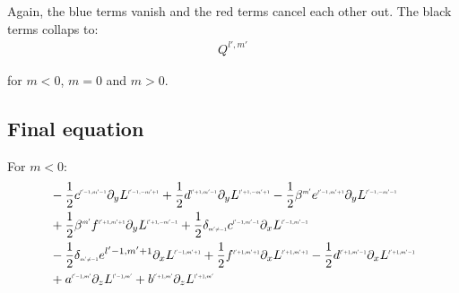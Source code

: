 \documentclass[10pt]{scrartcl}
\begin{document}
Again, the blue terms vanish and the red terms cancel each other out. The black terms collaps to:
\begin{align*}
Q^{l',m'}
\end{align*}

for $m<0$, $m=0$ and $m>0$.

\subsection{Final equation}

For $m<0$:
\begin{align*}
&-\frac{1}{2}c^{\scaleto{l'-1,m'-1}{4pt}}
\partial_y
L^{\scaleto{l'-1,-m'+1}{4pt}}
+\frac{1}{2}d^{\scaleto{l'+1,m'-1}{4pt}}
\partial_y
L^{\scaleto{l'+1,-m'+1}{4pt}}
-\frac{1}{2}\beta^{\scaleto{m'}{4pt}}e^{\scaleto{l'-1,m'+1}{4pt}}
\partial_y
L^{\scaleto{l'-1,-m'-1}{4pt}}
\\&
+\frac{1}{2}\beta^{\scaleto{m'}{4pt}}f^{\scaleto{l'+1,m'+1}{4pt}}
\partial_y
L^{\scaleto{l'+1,-m'-1}{4pt}}
+\frac{1}{2}\delta_{\scaleto{m'\neq -1}{4pt}}c^{\scaleto{l'-1,m'-1}{4pt}}
\partial_x
L^{\scaleto{l'-1,m'-1}{4pt}}
\\&
-\frac{1}{2}\delta_{\scaleto{m'\neq -1}{4pt}}e^{{l'-1,m'+1}}
\partial_x
L^{\scaleto{l'-1,m'+1}{4pt}}
+\frac{1}{2}f^{\scaleto{l'+1,m'+1}{4pt}}
\partial_x
L^{\scaleto{l'+1,m'+1}{4pt}}
-\frac{1}{2}d^{\scaleto{l'+1,m'-1}{4pt}}
\partial_x
L^{\scaleto{l'+1,m'-1}{4pt}}
\\&
+a^{\scaleto{l'-1,m'}{4pt}}
\partial_z
L^{\scaleto{l'-1,m'}{4pt}}
+b^{\scaleto{l'+1,m'}{4pt}}
\partial_z
L^{\scaleto{l'+1,m'}{4pt}}
\end{align*}
%
%
\end{document}
